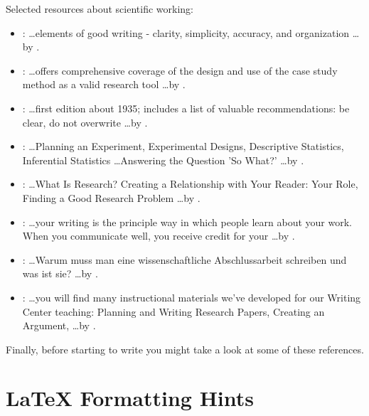 Selected resources about scientific working: 
\begin{itemize}
  \item \emph{}: \ldots elements of good writing - clarity, simplicity, accuracy, and organization \ldots by \cite{Zobel:2004}.
  
  \item \emph{}: \ldots offers comprehensive coverage of the design and use of the case study method as a valid research tool \ldots by \cite{Yin:2013}.

  \item \emph{}: \ldots first edition about 1935; includes a list of valuable recommendations: be clear, do not overwrite \ldots by \cite{Strunk:2000}.

  \item \emph{}: \ldots Planning an Experiment, Experimental Designs, Descriptive Statistics, Inferential Statistics \ldots Answering the Question 'So What?' \ldots by \cite{Field:2003}.

  \item \emph{}: \ldots What Is Research? Creating a Relationship with Your Reader: Your Role, Finding a Good Research Problem \ldots by \cite{Booth:2008}.

  \item \emph{}: \ldots your writing is the principle way in which people learn about your work. When you communicate well, you receive credit for your \ldots by \cite{Alley:1998}.

  \item \emph{}: \ldots Warum muss man eine wissenschaftliche Abschlussarbeit schreiben und was ist sie? \ldots by \cite{Eco:2010}.

  \item \emph{}: \ldots you will find many instructional materials we've developed for our Writing Center teaching: Planning and Writing Research Papers, Creating an Argument, \ldots by \cite{Wisconsin:2004}.

\end{itemize}

Finally, before starting to write you might take a look at some of these references.


\section{\LaTeX{} Formatting Hints}

